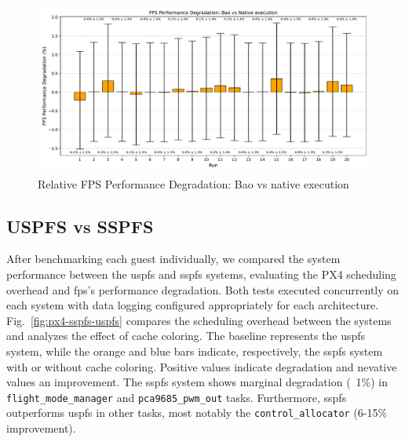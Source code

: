 \begin{figure}[!hbt]
  \centering
  \includegraphics[width=1.0\textwidth]{./img/pdf/fps-cmp} 
%   
  \caption{Relative FPS Performance Degradation: Bao vs native execution}%
  \label{fig:fps-cmp}
\end{figure}

\subsection{USPFS vs SSPFS}
\label{sec:uspfs-vs-sspfs}
After benchmarking each guest individually, we compared the system performance
between the \gls{uspfs} and \gls{sspfs} systems, evaluating the PX4 scheduling
overhead and \gls{fps}'s performance degradation. Both tests executed
concurrently on each system with data logging configured appropriately for each architecture.
%
Fig.~\ref{fig:px4-sspfs-uspfs} compares the scheduling overhead between the
systems and analyzes the effect of cache coloring. The baseline represents the
\gls{uspfs} system, while the orange and blue bars indicate, respectively, the
\gls{sspfs} system with or without cache coloring. Positive values indicate
degradation and nevative values an improvement. The \gls{sspfs} system shows
marginal degradation (~1\%) in \lstinline{flight_mode_manager} and \lstinline{pca9685_pwm_out}
tasks. Furthermore,  \gls{sspfs} outperforms \gls{uspfs} in other tasks, most
notably the \lstinline{control_allocator} (6-15\% improvement).

